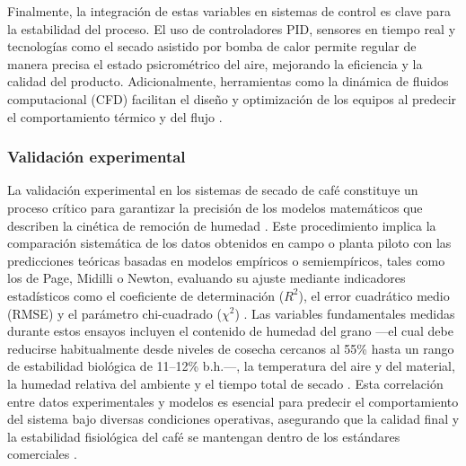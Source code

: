 Finalmente, la integración de estas variables en sistemas de control es clave para la estabilidad del proceso. El uso de controladores PID, sensores en tiempo real y tecnologías como el secado asistido por bomba de calor permite regular de manera precisa el estado psicrométrico del aire, mejorando la eficiencia y la calidad del producto. Adicionalmente, herramientas como la dinámica de fluidos computacional (CFD) facilitan el diseño y optimización de los equipos al predecir el comportamiento térmico y del flujo \parencite{arifin_controlling_2024, rabello_modeling_2021}.

\subsubsection{Validación experimental}

La validación experimental en los sistemas de secado de café constituye un proceso crítico para garantizar la precisión de los modelos matemáticos que describen la cinética de remoción de humedad \parencite{briceno-martinez_propuesta_2020, cruz-ospina_improving_2026}. Este procedimiento implica la comparación sistemática de los datos obtenidos en campo o planta piloto con las predicciones teóricas basadas en modelos empíricos o semiempíricos, tales como los de Page, Midilli o Newton, evaluando su ajuste mediante indicadores estadísticos como el coeficiente de determinación ($R^2$), el error cuadrático medio (RMSE) y el parámetro chi-cuadrado ($\chi^2$) \parencite{cansee_effect_2026, guemouni_convective_2022, institute_of_food_and_biotechnology_can_tho_university_vietnam_impact_2022, pramono_low_2022, suherman_energy_2020}. Las variables fundamentales medidas durante estos ensayos incluyen el contenido de humedad del grano —el cual debe reducirse habitualmente desde niveles de cosecha cercanos al 55\% hasta un rango de estabilidad biológica de 11--12\% b.h.—, la temperatura del aire y del material, la humedad relativa del ambiente y el tiempo total de secado \parencite{cruz-ospina_improving_2026, hendrarsakti_thermal_2019, leonardo_barcelos_mateus_modeling_2021, pramono_low_2022}. Esta correlación entre datos experimentales y modelos es esencial para predecir el comportamiento del sistema bajo diversas condiciones operativas, asegurando que la calidad final y la estabilidad fisiológica del café se mantengan dentro de los estándares comerciales \parencite{leonardo_barcelos_mateus_modeling_2021, cruz-ospina_improving_2026, rabello_modeling_2021, suherman_energy_2020}.

